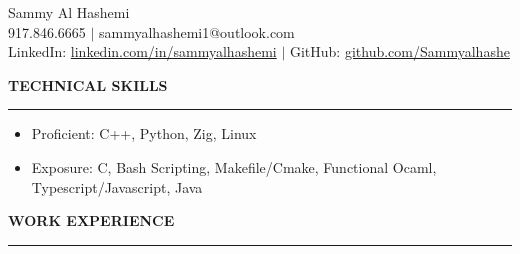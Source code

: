 \documentclass[12pt]{article}
\newcommand{\sectionRule}{\textcolor{gray}{\rule{7.27in}{0.02cm}}}
\newcommand{\sectionTxt}[1]{\noindent\textbf{#1}\\}
\begin{document}
    \begin{center}
        {\huge Sammy Al Hashemi}\\
        {\normalsize 917.846.6665 $|$ sammyalhashemi1@outlook.com}\\
        {\normalsize LinkedIn: \href{https://www.linkedin.com/in/sammyalhashemi}{linkedin.com/in/sammyalhashemi} $|$ GitHub: \href{https://github.com/Sammyalhashe}{github.com/Sammyalhashe}}\\
    \end{center}
    \sectionTxt{TECHNICAL SKILLS}
    \sectionRule
    \begin{small}
        \begin{itemize}
            \itemsep0em 
            \item Proficient: {\color{textGray}C++, Python, Zig, Linux}
            \item Exposure: {\color{textGray}C, Bash Scripting, Makefile/Cmake, Functional Ocaml, Typescript/Javascript, Java}
        \end{itemize}
    \end{small}
    \sectionTxt{WORK EXPERIENCE}
    \sectionRule
\end{document}
